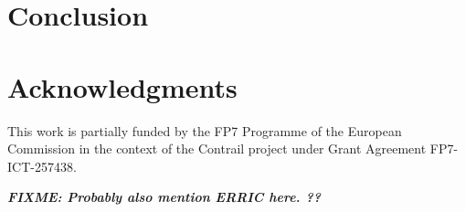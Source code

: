\documentclass[10pt,twocolumn]{article}
\newcommand{\fixme}[1]
{
  \noindent
  \begin{boxedminipage}{\linewidth}
    \textsl{{\bf FIXME: #1}}
  \end{boxedminipage}
}
\begin{document}


\section{Conclusion \label{conclu}}




\section{Acknowledgments}

This work is partially funded by the FP7 Programme of the European
Commission in the context of the Contrail project under Grant
Agreement FP7-ICT-257438.

\fixme{Probably also mention ERRIC here. ??}




\end{document}

